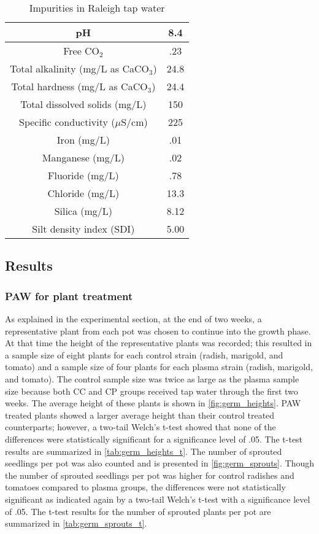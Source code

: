 \begin{table}[htpb]
  \begin{center}
    \begin{tabular}{|c |c |}
      \hline
      pH & 8.4 \\\hline
      Free CO$_2$ & .23 \\\hline
      Total alkalinity (mg/L as CaCO$_3$) & 24.8 \\\hline
      Total hardness (mg/L as CaCO$_3$) & 24.4 \\\hline
      Total dissolved solids (mg/L) & 150 \\\hline
      Specific conductivity ($\mu$S/cm) & 225 \\\hline
      Iron (mg/L) & .01 \\\hline
      Manganese (mg/L) & .02 \\\hline
      Fluoride (mg/L) & .78 \\\hline
      Chloride (mg/L) & 13.3 \\\hline
      Silica (mg/L) & 8.12 \\\hline
      Silt density index (SDI) & 5.00 \\
      \hline
    \end{tabular}
  \end{center}
  \caption{Impurities in Raleigh tap water}
  \label{tab:tap_water}
\end{table}

\subsection{Results}

\subsubsection{PAW for plant treatment}

As explained in the experimental section, at the end of two weeks, a representative plant from each pot was chosen to continue into the growth phase.  At that time the height of the representative plants was recorded; this resulted in a sample size of eight plants for each control strain (radish, marigold, and tomato) and a sample size of four plants for each plasma strain (radish, marigold, and tomato).  The control sample size was twice as large as the plasma sample size because both CC and CP groups received tap water through the first two weeks.  The average height of these plants is shown in \cref{fig:germ_heights}. PAW treated plants showed a larger average height than their control treated counterparts; however, a two-tail Welch's t-test showed that none of the differences were statistically significant for a significance level of .05.  The t-test results are summarized in \cref{tab:germ_heights_t}.    The number of sprouted seedlings per pot was also counted and is presented in \cref{fig:germ_sprouts}.  Though the number of sprouted seedlings per pot was higher for control radishes and tomatoes compared to plasma groups, the differences were not statistically significant as indicated again by a two-tail Welch's t-test with a significance level of .05.  The t-test results for the number of sprouted plants per pot are summarized in \cref{tab:germ_sprouts_t}.

